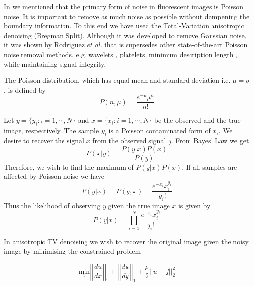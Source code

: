 \begin{definition}
	In  we mentioned that the primary form of noise in fluorescent images is Poisson noise. It is important to remove as much noise as possible without dampening the boundary information. To this end we have used the Total-Variation anisotropic denoising (Bregman Split). Although it was developed to remove Gaussian noise, it was shown by Rodriguez \textit{et al.}\citep{Rodriguez2008} that is supersedes other state-of-the-art Poisson noise removal methods, e.g.  wavelets \citep{Timmermann1999}, platelets\citep{Willett2004}, minimum description length \citep{Nowak1999}, while maintaining signal integrity. 
	
	The Poisson distribution, which has equal mean and standard deviation i.e. $\mu = \sigma$, is defined by
	\begin{equation}
	P(n,\mu) = \frac{e^{-\mu}\mu^{n}}{n!}
	\label{eq:poissondist}
	\end{equation}
	
	Let $y = \lbrace y_i:i=1, \cdots, N \rbrace$ and $x = \lbrace x_i:i=1, \cdots, N \rbrace$ be the observed and the true image, respectively. The sample $y_i$ is a Poisson contaminated form of $x_i$. We desire to recover the signal $x$ from the observed signal $y$. From Bayes' Law we get
	\begin{equation}
	P(x \vert y) = \frac{P(y \vert x)P(x)}{P(y)}
	\label{eq:bayeslaw}
	\end{equation}
	Therefore, we wish to find the maximum of $P(y \vert x)P(x)$. If all samples are affected by Poisson noise we have
	\begin{equation}
	P(y \vert x) = P(y,x) = \frac{e^{-x_i}x_i^{y_i}}{y_i!}
	\label{eq:poissonafect}
	\end{equation}
	Thus the likelihood of observing $y$ given the true image $x$ is given by
	\begin{equation}
	P(y \vert x) = \prod_{i=1}^{N} \frac{e^{-x_i}x_i^{y_i}}{y_i!}
	\label{eq:poissonlikelihood}
	\end{equation}
	
	In anisotropic TV denoising we wish to recover the original image given the noisy image by minimising the constrained problem
	
	\begin{equation}
	\underset{u} {\mathrm{min}} \left| \left| \frac{du}{dx} \right| \right|_1 + \left| \left| \frac{du}{dy} \right| \right|_1 + \frac{\mu}{2} \left| \left| u-f \right| \right|^2_2
	\label{equ:anisotropic_tv_constrained}
	\end{equation}
	

\end{definition}

